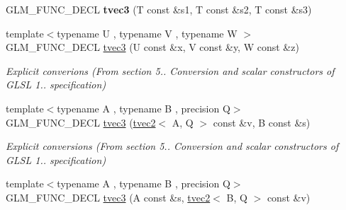 \begin{DoxyCompactItemize}
\item 
\hypertarget{structglm_1_1detail_1_1tvec3_af282d8b360f521784a9a5a5240451aec}{G\-L\-M\-\_\-\-F\-U\-N\-C\-\_\-\-D\-E\-C\-L {\bfseries tvec3} (T const \&s1, T const \&s2, T const \&s3)}\label{structglm_1_1detail_1_1tvec3_af282d8b360f521784a9a5a5240451aec}

\item 
\hypertarget{structglm_1_1detail_1_1tvec3_aa1c2ac2585b673f7238017266ba427e9}{{\footnotesize template$<$typename U , typename V , typename W $>$ }\\G\-L\-M\-\_\-\-F\-U\-N\-C\-\_\-\-D\-E\-C\-L \hyperlink{structglm_1_1detail_1_1tvec3_aa1c2ac2585b673f7238017266ba427e9}{tvec3} (U const \&x, V const \&y, W const \&z)}\label{structglm_1_1detail_1_1tvec3_aa1c2ac2585b673f7238017266ba427e9}

\begin{DoxyCompactList}\small\item\em Explicit converions (From section 5.. Conversion and scalar constructors of G\-L\-S\-L 1.. specification) \end{DoxyCompactList}\item 
\hypertarget{structglm_1_1detail_1_1tvec3_aa267579f4071920b9908f7ec7779cfe1}{{\footnotesize template$<$typename A , typename B , precision Q$>$ }\\G\-L\-M\-\_\-\-F\-U\-N\-C\-\_\-\-D\-E\-C\-L \hyperlink{structglm_1_1detail_1_1tvec3_aa267579f4071920b9908f7ec7779cfe1}{tvec3} (\hyperlink{structglm_1_1detail_1_1tvec2}{tvec2}$<$ A, Q $>$ const \&v, B const \&s)}\label{structglm_1_1detail_1_1tvec3_aa267579f4071920b9908f7ec7779cfe1}

\begin{DoxyCompactList}\small\item\em Explicit conversions (From section 5.. Conversion and scalar constructors of G\-L\-S\-L 1.. specification) \end{DoxyCompactList}\item 
\hypertarget{structglm_1_1detail_1_1tvec3_a0c479351c5b7c950e5470b8ed287997d}{{\footnotesize template$<$typename A , typename B , precision Q$>$ }\\G\-L\-M\-\_\-\-F\-U\-N\-C\-\_\-\-D\-E\-C\-L \hyperlink{structglm_1_1detail_1_1tvec3_a0c479351c5b7c950e5470b8ed287997d}{tvec3} (A const \&s, \hyperlink{structglm_1_1detail_1_1tvec2}{tvec2}$<$ B, Q $>$ const \&v)}\label{structglm_1_1detail_1_1tvec3_a0c479351c5b7c950e5470b8ed287997d}


\end{DoxyCompactItemize}
